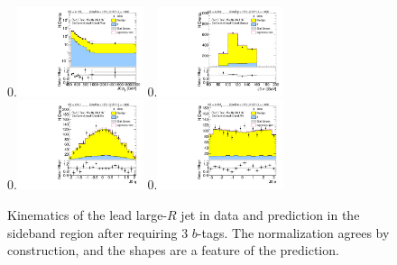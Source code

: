 \clearpage

\begin{figure}[htbp!]
\begin{center}
0.\includegraphics[width=0.33\textwidth, angle=270]{./figures/boosted/Control/Moriond_ThreeTag_Control_leadHCand_Pt_m_1.pdf}
0.\includegraphics[width=0.33\textwidth, angle=270]{./figures/boosted/Control/Moriond_ThreeTag_Control_leadHCand_Mass_s.pdf}\\
0.\includegraphics[width=0.33\textwidth, angle=270]{./figures/boosted/Control/Moriond_ThreeTag_Control_leadHCand_Eta.pdf}
0.\includegraphics[width=0.33\textwidth, angle=270]{./figures/boosted/Control/Moriond_ThreeTag_Control_leadHCand_Phi.pdf}
  \caption{Kinematics of the lead large-$R$ jet in data and prediction in the sideband region after requiring 3 $b$-tags. The normalization agrees by construction, and the shapes are a feature of the prediction.}
  \label{fig:boosted-3b-control-ak10-lead}
\end{center}
\end{figure}

